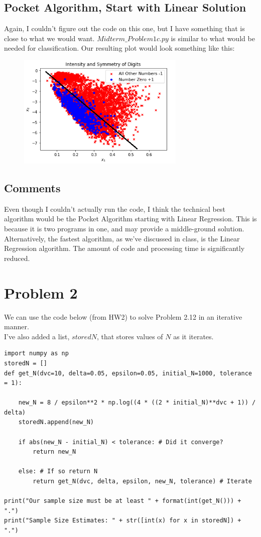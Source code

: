 \documentclass[a4paper]{article}
\begin{document}
\subsection{Pocket Algorithm, Start with Linear Solution}

Again, I couldn't figure out the code on this one, but I have something that is close to what we would want. $Midterm\_Problem1c.py$ is similar to what would be needed for classification. Our resulting plot would look something like this:

\begin{figure}[h]
  \begin{center}
    \includegraphics[width=80mm,scale=0.8]{typeC.png}
  \end{center}
\end{figure}

\subsection{Comments}

Even though I couldn't actually run the code, I think the technical best algorithm would be the Pocket Algorithm starting with Linear Regression. This is because it is two programs in one, and may provide a middle-ground solution. Alternatively, the fastest algorithm, as we've discussed in class, is the Linear Regression algorithm. The amount of code and processing time is significantly reduced.

\section{Problem 2}
We can use the code below (from HW2) to solve Problem 2.12 in an iterative manner. \\
I've also added a list, $storedN$, that stores values of $N$ as it iterates. \\
\begin{lstlisting}[frame=single]
import numpy as np
storedN = []
def get_N(dvc=10, delta=0.05, epsilon=0.05, initial_N=1000, tolerance = 1):
    
    new_N = 8 / epsilon**2 * np.log((4 * ((2 * initial_N)**dvc + 1)) / delta)
    storedN.append(new_N)
    
    if abs(new_N - initial_N) < tolerance: # Did it converge?
        return new_N
          
    else: # If so return N
        return get_N(dvc, delta, epsilon, new_N, tolerance) # Iterate

print("Our sample size must be at least " + format(int(get_N())) + ".")
print("Sample Size Estimates: " + str([int(x) for x in storedN]) + ".")
\end{lstlisting}
\end{document}
